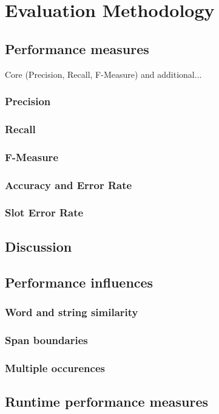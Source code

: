 \section{Evaluation Methodology}

\subsection{Performance measures}
Core (Precision, Recall, F-Measure) and additional...

\subsubsection{Precision}
\subsubsection{Recall}
\subsubsection{F-Measure}
\subsubsection{Accuracy and Error Rate}
\subsubsection{Slot Error Rate}


\subsection{Discussion}

\subsection{Performance influences}

\subsubsection{Word and string similarity}
\subsubsection{Span boundaries}
\subsubsection{Multiple occurences}

\subsection{Runtime performance measures}